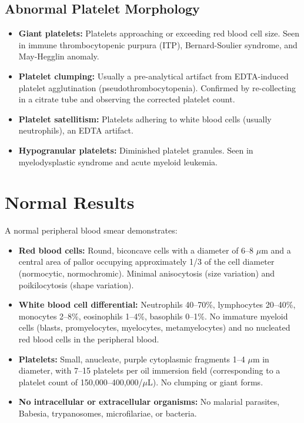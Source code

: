 \subsection*{Abnormal Platelet Morphology}
\begin{itemize}
  \item \textbf{Giant platelets:} Platelets approaching or exceeding red blood cell size. Seen in immune thrombocytopenic purpura (ITP), Bernard-Soulier syndrome, and May-Hegglin anomaly.
  \item \textbf{Platelet clumping:} Usually a pre-analytical artifact from EDTA-induced platelet agglutination (pseudothrombocytopenia). Confirmed by re-collecting in a citrate tube and observing the corrected platelet count.
  \item \textbf{Platelet satellitism:} Platelets adhering to white blood cells (usually neutrophils), an EDTA artifact.
  \item \textbf{Hypogranular platelets:} Diminished platelet granules. Seen in myelodysplastic syndrome and acute myeloid leukemia.
\end{itemize}

\section*{Normal Results}
A normal peripheral blood smear demonstrates:
\begin{itemize}
  \item \textbf{Red blood cells:} Round, biconcave cells with a diameter of 6--8 $\mu$m and a central area of pallor occupying approximately 1/3 of the cell diameter (normocytic, normochromic). Minimal anisocytosis (size variation) and poikilocytosis (shape variation).
  \item \textbf{White blood cell differential:} Neutrophils 40--70\%, lymphocytes 20--40\%, monocytes 2--8\%, eosinophils 1--4\%, basophils 0--1\%. No immature myeloid cells (blasts, promyelocytes, myelocytes, metamyelocytes) and no nucleated red blood cells in the peripheral blood.
  \item \textbf{Platelets:} Small, anucleate, purple cytoplasmic fragments 1--4 $\mu$m in diameter, with 7--15 platelets per oil immersion field (corresponding to a platelet count of 150,000--400,000/$\mu$L). No clumping or giant forms.
  \item \textbf{No intracellular or extracellular organisms:} No malarial parasites, Babesia, trypanosomes, microfilariae, or bacteria.
\end{itemize}

